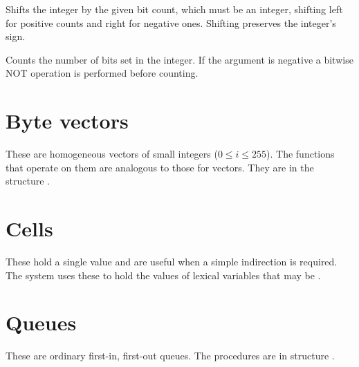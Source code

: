 \begin{protos}
\end{protos}
\noindent Shifts the integer by the given bit count, which must be an integer,
 shifting left for positive counts and right for negative ones.
Shifting preserves the integer's sign.

\begin{protos}
\end{protos}
\noindent Counts the number of bits set in the integer.
If the argument is negative a bitwise NOT operation is performed
 before counting.

\section{Byte vectors}

These are homogeneous vectors of small integers ($0 \le i \le 255$).
The functions that operate on them are analogous to those for vectors.
They are in the structure .

\begin{protos}
\end{protos}

\section{Cells}

These hold a single value and are useful when a simple indirection is
 required.
The system uses these to hold the values of lexical variables that
 may be .

\begin{protos}
\end{protos}

\section{Queues}

These are ordinary first-in, first-out queues.
The procedures are in structure .

